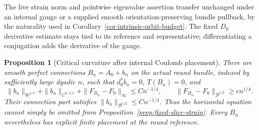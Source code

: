 \documentclass[11pt]{article}
\numberwithin{equation}{section}
\newtheorem{proposition}[theorem]{Proposition}
\theoremstyle{definition}
\theoremstyle{remark}
\begin{document}
The live strain norm and pointwise eigenvalue assertion
transfer unchanged under an internal gauge or a supplied
smooth orientation-preserving bundle pullback, by the naturality
used in Corollary~\ref{cor:intrinsic-orbit-budget}.
The fixed \(D_0\) derivative estimate stays tied to its
reference and representative; differentiating a conjugation
adds the derivative of the gauge.

\begin{proposition}[Critical curvature after internal Coulomb placement]
\label{prop:coulomb-curvature-oscillation}
There are smooth perfect connections \(B_n=A_0+b_n\) on the
actual round bundle, indexed by sufficiently large dyadic \(n\),
such that \(d_0^*b_n=0\), \(T(B_n)=0\), and
\[
 \|b_n\|_{W^{1,8}}+\|b_n\|_{C^{0,1/2}}
       +\|F_{B_n}-F_0\|_\infty\le Cn^{-1/4},\qquad
 \|F_{B_n}-F_0\|_{\mathcal B^{1/2}}\ge cn^{1/4}.
\]
Their connection part satisfies
\(\|b_n\|_{\mathcal B^{1/2}}\le Cn^{-1/4}\).
Thus the horizontal equation cannot simply be omitted
from Proposition~\ref{prop:fixed-slice-strain}.
Every \(B_n\) nevertheless has explicit finite placement
at the round reference.
\end{proposition}
\end{document}
